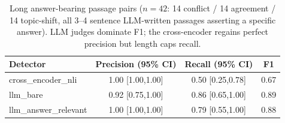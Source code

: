 \begin{table}[t]
\centering
\small
\begin{tabular}{lccc}
\toprule
Detector & Precision (95\% CI) & Recall (95\% CI) & F1 \\
\midrule
cross\_encoder\_nli & 1.00 [1.00,1.00] & 0.50 [0.25,0.78] & 0.67 \\
llm\_bare & 0.92 [0.75,1.00] & 0.86 [0.65,1.00] & 0.89 \\
llm\_answer\_relevant & 1.00 [1.00,1.00] & 0.79 [0.55,1.00] & 0.88 \\
\bottomrule
\end{tabular}
\caption{Long answer-bearing passage pairs ($n=42$:
14 conflict / 14 agreement /
14 topic-shift, all 3--4 sentence LLM-written passages asserting a
specific answer). LLM judges dominate F1; the cross-encoder regains perfect precision but
length caps recall.}
\label{tab:answer_bearing}
\end{table}
